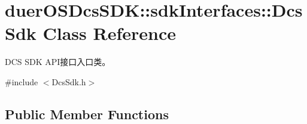 \hypertarget{classduerOSDcsSDK_1_1sdkInterfaces_1_1DcsSdk}{}\section{duer\+O\+S\+Dcs\+S\+DK\+:\+:sdk\+Interfaces\+:\+:Dcs\+Sdk Class Reference}
\label{classduerOSDcsSDK_1_1sdkInterfaces_1_1DcsSdk}


D\+CS S\+DK A\+P\+I接口入口类。  




{\ttfamily \#include $<$Dcs\+Sdk.\+h$>$}

\subsection*{Public Member Functions}
